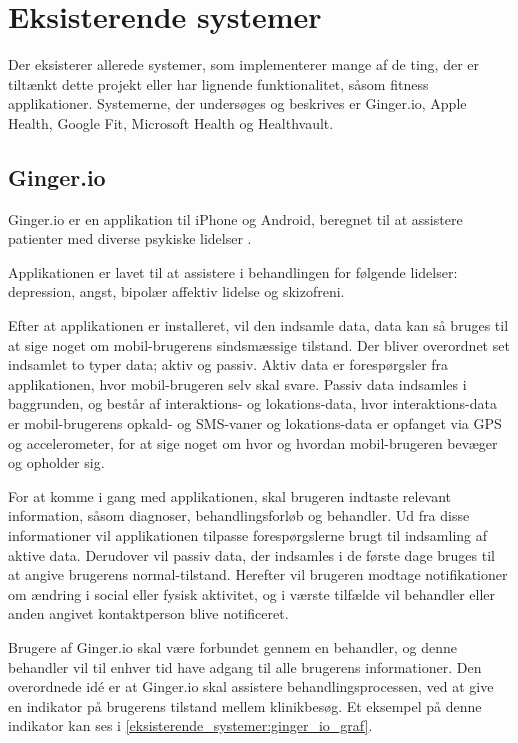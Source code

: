 \section{Eksisterende systemer}
Der eksisterer allerede systemer, som implementerer mange af de ting, der er tiltænkt dette projekt eller har lignende funktionalitet, såsom fitness applikationer. 
Systemerne, der undersøges og beskrives er Ginger.io, Apple Health, Google Fit, Microsoft Health og Healthvault.

\subsection{Ginger.io}
Ginger.io er en applikation til iPhone og Android, beregnet til at assistere patienter med diverse psykiske lidelser \citep{ginger_dot_io,gingerio_mit,gingerio_dailymail}.

Applikationen er lavet til at assistere i behandlingen for følgende lidelser: depression, angst, bipolær affektiv lidelse og skizofreni.

Efter at applikationen er installeret, vil den indsamle data, data kan så bruges til at sige noget om mobil-brugerens sindsmæssige tilstand.
Der bliver overordnet set indsamlet to typer data; aktiv og passiv.
Aktiv data er forespørgsler fra applikationen, hvor mobil-brugeren selv skal svare.
Passiv data indsamles i baggrunden, og består af interaktions- og lokations-data, hvor interaktions-data er mobil-brugerens opkald- og SMS-vaner og lokations-data er opfanget via GPS og accelerometer, for at sige noget om hvor og hvordan mobil-brugeren bevæger og opholder sig.

For at komme i gang med applikationen, skal brugeren indtaste relevant information, såsom diagnoser, behandlingsforløb og behandler.
Ud fra disse informationer vil applikationen tilpasse forespørgslerne brugt til indsamling af aktive data.
Derudover vil passiv data, der indsamles i de første dage bruges til at angive brugerens normal-tilstand.
Herefter vil brugeren modtage notifikationer om ændring i social eller fysisk aktivitet, og i værste tilfælde vil behandler eller anden angivet kontaktperson blive notificeret.

Brugere af Ginger.io skal være forbundet gennem en behandler, og denne behandler vil til enhver tid have adgang til alle brugerens informationer.
Den overordnede idé er at Ginger.io skal assistere behandlingsprocessen, ved at give en indikator på brugerens tilstand mellem klinikbesøg. 
Et eksempel på denne indikator kan ses i \cref{eksisterende_systemer:ginger_io_graf}.

